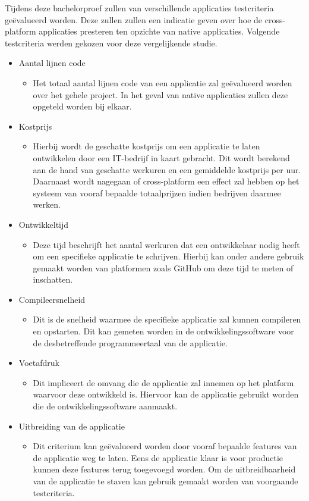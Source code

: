 Tijdens deze bachelorproef zullen van verschillende applicaties testcriteria geëvalueerd worden. Deze zullen zullen een indicatie geven over hoe de cross-platform applicaties presteren ten opzichte van native applicaties. Volgende testcriteria werden gekozen voor deze vergelijkende studie.
\begin{itemize}
    \item Aantal lijnen code
    \begin{itemize}
        \item Het totaal aantal lijnen code van een applicatie zal geëvalueerd worden over het gehele project. In het geval van native applicaties zullen deze opgeteld worden bij elkaar.
    \end{itemize}
    \item Kostprijs
    \begin{itemize}
        \item Hierbij wordt de geschatte kostprijs om een applicatie te laten ontwikkelen door een IT-bedrijf in kaart gebracht. Dit wordt berekend aan de hand van geschatte werkuren en een gemiddelde kostprijs per uur. Daarnaast wordt nagegaan of cross-platform een effect zal hebben op het systeem van vooraf bepaalde totaalprijzen indien bedrijven daarmee werken.
    \end{itemize}
    \item Ontwikkeltijd
    \begin{itemize}
        \item Deze tijd beschrijft het aantal werkuren dat een ontwikkelaar nodig heeft om een specifieke applicatie te schrijven. Hierbij kan onder andere gebruik gemaakt worden van platformen zoals GitHub om deze tijd te meten of inschatten.
    \end{itemize}
    \item Compileersnelheid
    \begin{itemize}
        \item Dit is de snelheid waarmee de specifieke applicatie zal kunnen compileren en opstarten. Dit kan gemeten worden in de ontwikkelingssoftware voor de desbetreffende programmeertaal van de applicatie.
    \end{itemize}
    \item Voetafdruk
    \begin{itemize}
        \item Dit impliceert de omvang die de applicatie zal innemen op het platform waarvoor deze ontwikkeld is. Hiervoor kan de applicatie gebruikt worden die de ontwikkelingssoftware aanmaakt.
    \end{itemize}
    \item Uitbreiding van de applicatie
    \begin{itemize}
        \item Dit criterium kan geëvalueerd worden door vooraf bepaalde features van de applicatie weg te laten. Eens de applicatie klaar is voor productie kunnen deze features terug toegevoegd worden. Om de uitbreidbaarheid van de applicatie te staven kan gebruik gemaakt worden van voorgaande testcriteria.
    \end{itemize}
\end{itemize}
